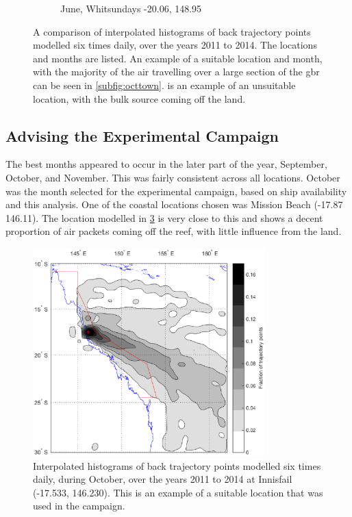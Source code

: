 \begin{figure}[!hbt]
\begin{subfigure}[b]{0.45\textwidth}
	    \caption{June, Whitsundays -20.06, 148.95}
	    \label{subfig:junewhit}
    \end{subfigure}
    \caption{ A comparison of interpolated histograms of back trajectory points modelled six times daily, over the years 2011 to 2014. The locations and months are listed. An example of a suitable location and month, with the majority of the air travelling over a large section of the \gls{gbr} can be seen in \cref{subfig:octtown}.  is an example of an unsuitable location, with the bulk source coming off the land. }
    \label{fig:comphisto}
	\end{figure}
	
	\subsection{Advising the Experimental Campaign}
	\label{subsec:expcamp}

	The best months appeared to occur in the later part of the year, September, October, and November. This was fairly consistent across all locations. October was the month selected for the experimental campaign, based on ship availability and this analysis. One of the coastal locations chosen was Mission Beach (-17.87 146.11). The location modelled in \cref{fig:chosenbtloc} is very close to this and shows a decent proportion of air packets coming off the reef, with little influence from the land.

	\begin{figure}[!htb]
    	\centering
    	\includegraphics[width=0.8\textwidth]{Fig/Research/BT_Ship/Map_105.eps}
    	\caption{ Interpolated histograms of back trajectory points modelled six times daily, during October, over the years 2011 to 2014 at Innisfail (-17.533, 146.230). This is an example of a suitable location that was used in the campaign. }
    \label{fig:chosenbtloc}
	\end{figure}

